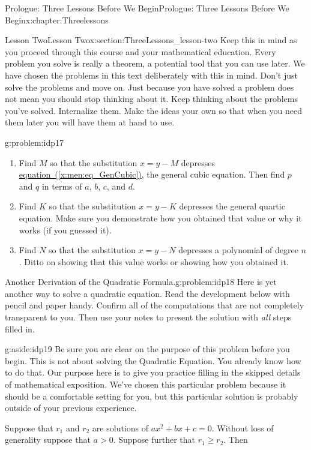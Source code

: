 \begin{chapterptx}{Prologue: Three Lessons Before We Begin}{}{Prologue: Three Lessons Before We Begin}{}{}{x:chapter:Threelessons}
\begin{sectionptx}{Lesson Two}{}{Lesson Two}{}{}{x:section:ThreeLessons_lesson-two}
		Keep this in mind as you proceed through this course and your mathematical education. Every problem you solve is really a theorem, a potential tool that you can use later. We have chosen the problems in this text deliberately with this in mind. Don't just solve the problems and move on. Just because you have solved a problem does not mean you should stop thinking about it. Keep thinking about the problems you've solved. Internalize them. Make the ideas your own so that when you need them later you will have them at hand to use.%
		\begin{problem}{}{g:problem:idp17}%
			\begin{enumerate}[label=(\alph*)]
				\item{}Find \(M\) so that the substitution \(x=y-M\) depresses \hyperref[x:men:eq_GenCubic]{equation~({\xreffont\ref{x:men:eq_GenCubic}})}, the general cubic equation. Then find \(p\) and \(q\) in terms of \(a\), \(b\), \(c\), and \(d\).%
				\item{}Find \(K\) so that the substitution \(x=y-K\) depresses the general quartic equation. Make sure you demonstrate how you obtained that value or why it works (if you guessed it).%
				\item{}Find \(N\) so that the substitution \(x=y-N\) depresses a polynomial of degree \(n\). Ditto on showing that this value works or showing how you obtained it.%
			\end{enumerate}
		\end{problem}
		\begin{problem}{Another Derivation of the Quadratic Formula.}{g:problem:idp18}%
			 Here is yet another way to solve a quadratic equation. Read the development below with pencil and paper handy. Confirm all of the computations that are not completely transparent to you. Then use your notes to present the solution with \emph{all} steps filled in.%
			\begin{aside}{}{g:aside:idp19}%
				Be sure you are clear on the purpose of this problem before you begin. This is not about solving the Quadratic Equation. You already know how to do that. Our purpose here is to give you practice filling in the skipped details of mathematical exposition. We've chosen this particular problem because it should be a comfortable setting for you, but this particular solution is probably outside of your previous experience.%
			\end{aside}
			Suppose that \(r_1\) and \(r_2\) are solutions of \(ax^2+bx+c=0\). Without loss of generality suppose that \(a>0\).  Suppose further that \(r_1\ge r_2\).  Then%

\end{problem}
\end{sectionptx}
\end{chapterptx}

